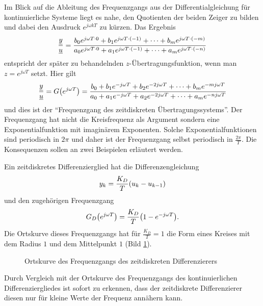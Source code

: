 Im Blick auf die Ableitung des Frequenzgangs aus der Differentialgleichung für kontinuierliche Systeme liegt es nahe, den Quotienten der beiden Zeiger zu bilden und dabei den Ausdruck \(e^{j\omega kT}\) zu kürzen.
Das Ergebnis
\begin{equation}
	\frac{\underline{y}}{\underline{u}} = \frac{b_0 e^{j\omega T \cdot 0} + b_1 e^{j\omega T \cdot \parentheses*{-1}} + \cdots + b_m e^{j\omega T \cdot \parentheses*{-m}}}{a_0 e^{j\omega T \cdot 0} + a_1 e^{j\omega T \cdot \parentheses*{-1}} + \cdots + a_m e^{j\omega T \cdot \parentheses*{-n}}}
\end{equation}
entspricht der später zu behandelnden \(z\)-Übertragungsfunktion, wenn man \(z = e^{j\omega T}\) setzt.
Hier gilt
\begin{equation}
	\frac{\underline{y}}{\underline{u}} = G\parentheses*{e^{j\omega T}} = \frac{b_0 + b_1 e^{-j\omega T} + b_2 e^{-2j\omega T} + \cdots + b_m e^{-mj\omega T}}{a_0 + a_1 e^{-j\omega T} + a_2 e^{-2j\omega T} + \cdots + a_m e^{-nj\omega T}}
\end{equation}
und dies ist der ``Frequenzgang des zeitdiskreten Übertragungssystems''.
Der Frequenzgang hat nicht die Kreisfrequenz als Argument sondern eine Exponentialfunktion mit imaginärem Exponenten.
Solche Exponentialfunktionen sind periodisch in \(2\pi\) und daher ist der Frequenzgang selbst periodisch in \(\frac{2\pi}{T}\).
Die Konsequenzen sollen an zwei Beispielen erläutert werden.

Ein zeitdiskretes Differenzierglied hat die Differenzengleichung
\begin{equation}
	y_k = \frac{K_D}{T}\parentheses*{u_k - u_{k - 1}}
\end{equation}
und den zugehörigen Frequenzgang
\begin{equation}
	G_D\parentheses*{e^{j\omega T}} = \frac{K_D}{T}\parentheses*{1 - e^{-j\omega T}}.
\end{equation}
Die Ortskurve dieses Frequenzgangs hat für \(\frac{K_D}{T} = 1\) die Form eines Kreises mit dem Radius \(1\) und dem Mittelpunkt \(1\) (Bild \ref{fig:6-6}).
\begin{figure}[ht]
	\centering
	\caption{Ortskurve des Frequenzgangs des zeitdiskreten Differenzierers}
	\label{fig:6-6}
\end{figure}
Durch Vergleich mit der Ortskurve des Frequenzgangs des kontinuierlichen Differenziergliedes ist sofort zu erkennen, dass der zeitdiskrete Differenzierer diesen nur für kleine Werte der Frequenz annähern kann.

